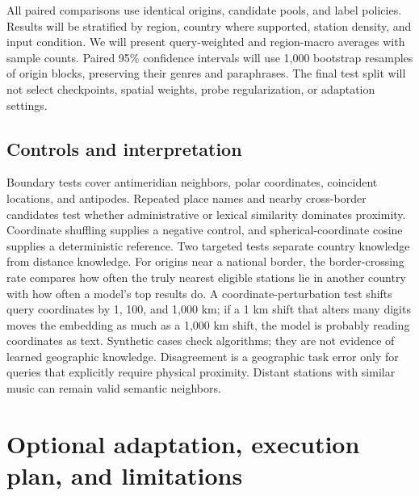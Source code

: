 \documentclass[10pt]{article}
\begin{document}
All paired comparisons use identical origins, candidate pools, and label policies. Results will be stratified by region, country where supported, station density, and input condition. We will present query-weighted and region-macro averages with sample counts. Paired 95\% confidence intervals will use 1,000 bootstrap resamples of origin blocks, preserving their genres and paraphrases. The final test split will not select checkpoints, spatial weights, probe regularization, or adaptation settings.

\subsection{Controls and interpretation}
Boundary tests cover antimeridian neighbors, polar coordinates, coincident locations, and antipodes. Repeated place names and nearby cross-border candidates test whether administrative or lexical similarity dominates proximity. Coordinate shuffling supplies a negative control, and spherical-coordinate cosine supplies a deterministic reference. Two targeted tests separate country knowledge from distance knowledge. For origins near a national border, the border-crossing rate compares how often the truly nearest eligible stations lie in another country with how often a model's top results do. A coordinate-perturbation test shifts query coordinates by 1, 100, and 1,000 km; if a 1 km shift that alters many digits moves the embedding as much as a 1,000 km shift, the model is probably reading coordinates as text. Synthetic cases check algorithms; they are not evidence of learned geographic knowledge. Disagreement is a geographic task error only for queries that explicitly require physical proximity. Distant stations with similar music can remain valid semantic neighbors.

\section{Optional adaptation, execution plan, and limitations}
\end{document}
